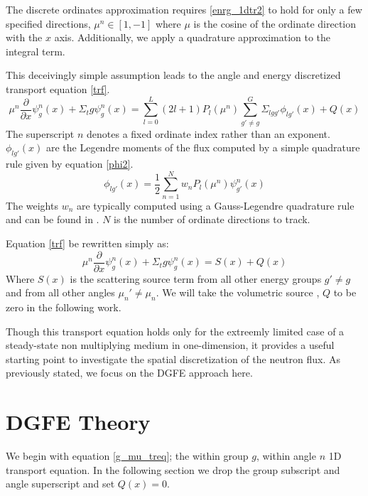 The discrete ordinates approximation requires \ref{enrg_1dtr2} to hold for only a few specified directions, $\mu^n \in [1, -1]$ where $\mu$ is the cosine of the ordinate direction with the $x$ axis.  Additionally, we apply a quadrature approximation to the integral term.

This deceivingly simple assumption leads to the angle and energy discretized transport equation \ref{trf}.
\begin{equation}
\mu^n \frac{\partial}{\partial x} \psi^n_{g}(x) + \Sigma_tg \psi^n_g(x) =
\sum_{l=0}^L (2l+1) P_l(\mu^n) 
\sum_{g'\neq g}^G \Sigma_{lgg'} \phi_{lg'}(x)
 + Q(x)
\label{trf}
\end{equation}
The superscript $n$ denotes a fixed ordinate index rather than an exponent.
$\phi_{lg'}(x)$ are the Legendre moments of the flux computed by a simple quadrature rule given by equation \ref{phi2}.
\begin{equation}
\phi_{lg'}(x) = \frac{1}{2}\sum_{n=1}^N w_n P_l(\mu^n)\psi^n_{g'}(x)
\label{phi2}
\end{equation}
The weights $w_n$ are typically computed using a Gauss-Legendre quadrature rule and can be found in \cite{Lewis}.  $N$ is the number of ordinate directions to track.

Equation \ref{trf} be rewritten simply as:
\begin{equation}
\mu^n \frac{\partial}{\partial x} \psi^n_{g}(x) + \Sigma_tg \psi^n_g(x) = S(x) + Q(x)
\label{g_mu_treq}
\end{equation}
Where $S(x)$ is the scattering source term from all other energy groups $g' \neq g$ and from all other angles $\mu_n' \ne \mu_n$.  We will take the volumetric source , $Q$ to be zero in the following work.

Though this transport equation holds only for the extreemly limited case of a steady-state non multiplying medium in one-dimension, it provides a useful starting point to investigate the spatial discretization of the neutron flux.
As previously stated, we focus on the DGFE approach here.

\section{DGFE Theory}

We begin with equation \ref{g_mu_treq}; the within group $g$, within angle $n$ 1D transport equation.  In the following section we drop the group subscript and angle superscript and set $Q(x)=0$.

